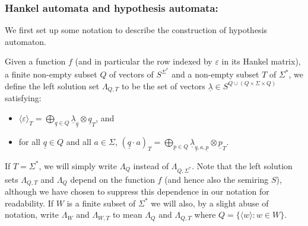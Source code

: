 \documentclass{lmcs}
\numberwithin{theorem}{section}
\begin{document}
\subsubsection*{\textbf{Hankel automata and hypothesis automata:}}
We first set up some notation to describe the construction of hypothesis automaton.  
\begin{nota}
	\label{notation:lambda}
Given a function $f$ (and in particular the row indexed by $\varepsilon$ in its Hankel matrix), a finite non-empty subset $Q$ of vectors of $S^{\Sigma^*}$ and a non-empty subset $T$ of $\Sigma^*$, we define the left solution set $\Lambda_{Q, T}$  to be the set of vectors $\underline{\lambda} \in S^{Q \cup (Q \times \Sigma \times Q)}$ satisfying:
\begin{itemize}
\item $\langle \varepsilon \rangle_T = \bigoplus_{\underline{q} \in Q} \underline{\lambda}_{\underline{q}} \otimes \underline{q}_T$, and
\item for all $\underline{q} \in Q$ and all $a \in \Sigma$, $(\underline{q}\cdot a)_T= \bigoplus_{\underline{p} \in Q} \underline{\lambda}_{\underline{q},a,\underline{p}} \otimes \underline{p}_T$.
\end{itemize}
If $T=\Sigma^*$,  we will simply write $\Lambda_{Q}$ instead of $\Lambda_{Q, \Sigma^*}$.
Note that the left solution sets $\Lambda_{Q,T}$ and $\Lambda_Q$ depend on the function $f$ (and hence also the semiring $S$), although we have chosen to suppress this dependence in our notation for readability. 
If $W$ is a finite subset of $\Sigma^*$ we will also, by a slight abuse of notation, write $\Lambda_W$
and $\Lambda_{W,T}$
to mean $\Lambda_{Q}$ and $\Lambda_{Q,T}$ where 
$Q = \{\langle w \rangle: w \in W\}$.
\end{nota}
\end{document}
